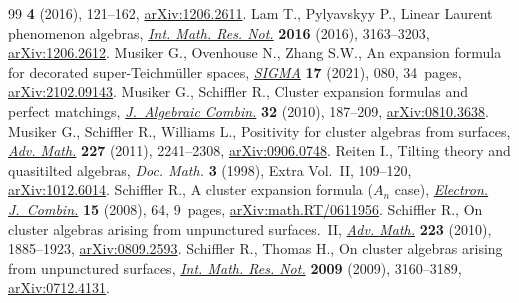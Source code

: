 \documentclass[pdftex]{sigma}
\numberwithin{equation}{section}
\begin{document}
\begin{thebibliography}{99}
 \textbf{4} (2016), 121--162, \href{https://arxiv.org/abs/1206.2611}{arXiv:1206.2611}.
Lam T., Pylyavskyy P., Linear {L}aurent phenomenon algebras, \href{https://doi.org/10.1093/imrn/rnv237}{\textit{Int. Math.
 Res. Not.}} \textbf{2016} (2016), 3163--3203, \href{https://arxiv.org/abs/1206.2612}{arXiv:1206.2612}.
Musiker G., Ovenhouse N., Zhang S.W., An expansion formula for decorated
 super-{T}eichm\"uller spaces, \href{https://doi.org/10.3842/SIGMA.2021.080}{\textit{SIGMA}} \textbf{17} (2021), 080,
 34~pages, \href{https://arxiv.org/abs/2102.09143}{arXiv:2102.09143}.
Musiker G., Schiffler R., Cluster expansion formulas and perfect matchings,
 \href{https://doi.org/10.1007/s10801-009-0210-3}{\textit{J.~Algebraic Combin.}} \textbf{32} (2010), 187--209,
 \href{https://arxiv.org/abs/0810.3638}{arXiv:0810.3638}.
Musiker G., Schiffler R., Williams L., Positivity for cluster algebras from
 surfaces, \href{https://doi.org/10.1016/j.aim.2011.04.018}{\textit{Adv. Math.}} \textbf{227} (2011), 2241--2308,
 \href{https://arxiv.org/abs/0906.0748}{arXiv:0906.0748}.
Reiten I., Tilting theory and quasitilted algebras, \textit{Doc. Math.}
 \textbf{3} (1998), Extra Vol.~II, 109--120, \href{https://arxiv.org/abs/1012.6014}{arXiv:1012.6014}.
Schiffler R., A cluster expansion formula ({$A_n$} case), \href{https://doi.org/10.37236/788}{\textit{Electron.
 J.~Combin.}} \textbf{15} (2008), 64, 9~pages, \href{https://arxiv.org/abs/math.RT/0611956}{arXiv:math.RT/0611956}.
Schiffler R., On cluster algebras arising from unpunctured surfaces.~{II},
 \href{https://doi.org/10.1016/j.aim.2009.10.015}{\textit{Adv. Math.}} \textbf{223} (2010), 1885--1923, \href{https://arxiv.org/abs/0809.2593}{arXiv:0809.2593}.
Schiffler R., Thomas H., On cluster algebras arising from unpunctured surfaces,
 \href{https://doi.org/10.1093/imrn/rnp047}{\textit{Int. Math. Res. Not.}} \textbf{2009} (2009), 3160--3189,
 \href{https://arxiv.org/abs/0712.4131}{arXiv:0712.4131}.
\end{thebibliography}\LastPageEnding
\end{document}

